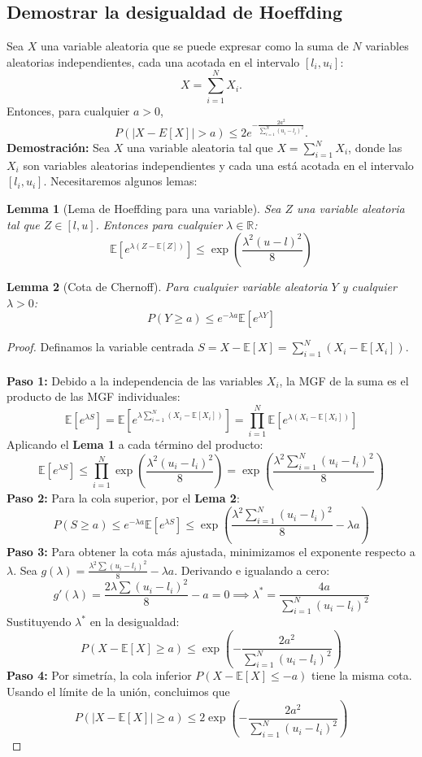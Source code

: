 \documentclass{article}
\newtheorem{lemma}{Lemma}
\begin{document}
\subsection{Demostrar la desigualdad de Hoeffding}
\noindent Sea $X$ una variable aleatoria que se puede expresar como la suma de $N$ variables aleatorias independientes, cada una acotada en el intervalo $[l_i,u_i]$: \[X = \sum_{i=1}^N X_i.\] Entonces, para cualquier $a>0$, \[P(|X-E[X]|>a) \leq 2e^{-\frac{2a^2}{\sum_{i=1}^N (u_i-l_i)^2}}.\]
\textbf{Demostración:}
Sea $X$ una variable aleatoria tal que $X = \sum_{i=1}^N X_i$, donde las $X_i$ son variables aleatorias independientes y cada una está acotada en el intervalo $[l_i, u_i]$. Necesitaremos algunos lemas:
\begin{lemma}[Lema de Hoeffding para una variable]
Sea $Z$ una variable aleatoria tal que $Z \in [l, u]$. Entonces para cualquier $\lambda \in \mathbb{R}$:
\[ \mathbb{E}\left[ e^{\lambda(Z - \mathbb{E}[Z])} \right] \leq \exp\left( \frac{\lambda^2(u - l)^2}{8} \right) \]
\end{lemma}
\begin{lemma}[Cota de Chernoff]
Para cualquier variable aleatoria $Y$ y cualquier $\lambda > 0$:
\[ P(Y \geq a) \leq e^{-\lambda a} \mathbb{E}[e^{\lambda Y}] \]
\end{lemma}
\begin{proof}
Definamos la variable centrada $S = X - \mathbb{E}[X] = \sum_{i=1}^N (X_i - \mathbb{E}[X_i])$. \\ \\
\textbf{Paso 1:}
Debido a la independencia de las variables $X_i$, la MGF de la suma es el producto de las MGF individuales:
\[
\mathbb{E}[e^{\lambda S}] = \mathbb{E}\left[ e^{\lambda \sum_{i=1}^N (X_i - \mathbb{E}[X_i])} \right] = \prod_{i=1}^N \mathbb{E}\left[ e^{\lambda (X_i - \mathbb{E}[X_i])} \right]
\]
Aplicando el \textbf{Lema 1} a cada término del producto:
\[
\mathbb{E}[e^{\lambda S}] \leq \prod_{i=1}^N \exp\left( \frac{\lambda^2 (u_i - l_i)^2}{8} \right) = \exp\left( \frac{\lambda^2 \sum_{i=1}^N (u_i - l_i)^2}{8} \right)
\]
\textbf{Paso 2:}
Para la cola superior, por el \textbf{Lema 2}:
\[
P(S \geq a) \leq e^{-\lambda a} \mathbb{E}[e^{\lambda S}] \leq \exp\left( \frac{\lambda^2 \sum_{i=1}^N (u_i - l_i)^2}{8} - \lambda a \right)
\]
\textbf{Paso 3:}
Para obtener la cota más ajustada, minimizamos el exponente respecto a $\lambda$. Sea $g(\lambda) = \frac{\lambda^2 \sum (u_i - l_i)^2}{8} - \lambda a$. Derivando e igualando a cero:
\[
g'(\lambda) = \frac{2\lambda \sum (u_i - l_i)^2}{8} - a = 0 \implies \lambda^* = \frac{4a}{\sum_{i=1}^N (u_i - l_i)^2}
\]
Sustituyendo $\lambda^*$ en la desigualdad:
\[
P(X - \mathbb{E}[X] \geq a) \leq \exp\left( -\frac{2a^2}{\sum_{i=1}^N (u_i - l_i)^2} \right)
\]
\textbf{Paso 4:}
Por simetría, la cola inferior $P(X - \mathbb{E}[X] \leq -a)$ tiene la misma cota. Usando el límite de la unión, concluimos que
\[
P(|X - \mathbb{E}[X]| \geq a) \leq 2\exp\left( -\frac{2a^2}{\sum_{i=1}^N (u_i - l_i)^2} \right)
\]
\end{proof}
\end{document}

